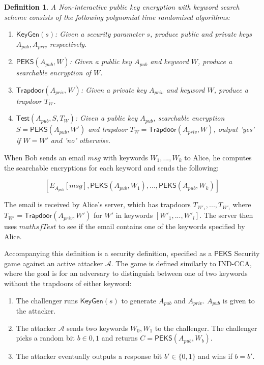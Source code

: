\documentclass[a4paper,11pt]{article}
\newtheorem{definition}{Definition}
\begin{document}
    \begin{definition}
        A Non-interactive public key encryption with keyword search scheme consists of the following polynomial time randomised algorithms:

        \begin{enumerate}
            \item $\mathsf{KeyGen}(s)$: Given a security parameter $s$, produce public and private keys $A_{pub}, A_{priv}$ respectively.
            \item $\mathsf{PEKS}(A_{pub}, W)$: Given a public key $A_{pub}$ and keyword $W$, produce a searchable encryption of $W$.
            \item $\mathsf{Trapdoor}(A_{priv}, W)$: Given a private key $A_{priv}$ and keyword $W$, produce a trapdoor $T_W$.
            \item $\mathsf{Test}(A_{pub}, S, T_W)$: Given a public key $A_{pub}$, searchable encryption $S = \mathsf{PEKS}(A_{pub}, W')$ and trapdoor $T_W = \mathsf{Trapdoor}(A_{priv}, W)$, output 'yes' if $W = W'$ and 'no' otherwise.
        \end{enumerate}
    \end{definition}

    When Bob sends an email $msg$ with keywords $W_1,...,W_k$ to Alice, he computes the searchable encryptions for each keyword and sends the following:

    $$[E_{A_{pub}}[msg], \mathsf{PEKS}(A_{pub}, W_1),...,\mathsf{PEKS}(A_{pub}, W_k)]$$

    The email is received by Alice's server, which has trapdoors $T_{W'_1},...,T_{W'_l}$ where $T_{W'} = \mathsf{Trapdoor}(A_{priv}, W')$ for $W'$ in keywords $[W'_1,...,W'_l]$. The server then uses $mathsf{Test}$ to see if the email contains one of the keywords specified by Alice.

    Accompanying this definition is a security definition, specified as a $\mathsf{PEKS}$ Security game against an active attacker $\mathcal{A}$. The game is defined similarly to IND-CCA, where the goal is for an adversary to distinguish between one of two keywords without the trapdoors of either keyword:

    \begin{enumerate}
        \item The challenger runs $\mathsf{KeyGen}(s)$ to generate $A_{pub}$ and $A_{priv}$. $A_{pub}$ is given to the attacker.
        \item The attacker $\mathcal{A}$ sends two keywords $W_0, W_1$ to the challenger. The challenger picks a random bit $b \in {0,1}$ and returns $C = \mathsf{PEKS}(A_{pub}, W_b)$.
        \item The attacker eventually outputs a response bit $b' \in \{0,1\}$ and wins if $b = b'$.
    \end{enumerate}
\end{document}
